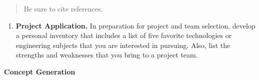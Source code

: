 \begin{quote}
Be sure to cite references.
\end{quote}

\begin{enumerate}
\def\labelenumi{\arabic{enumi}.}
\item
  \textbf{Project Application.} In preparation for project and team
  selection, develop a personal inventory that includes a list of five
  favorite technologies or engineering subjects that you are interested
  in pursuing. Also, list the strengths and weaknesses that you bring to
  a project team.
\end{enumerate}

\textbf{Concept Generation}
